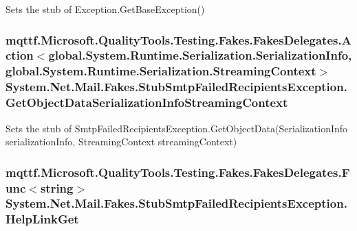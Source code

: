 Sets the stub of Exception.\-Get\-Base\-Exception()

\hypertarget{class_system_1_1_net_1_1_mail_1_1_fakes_1_1_stub_smtp_failed_recipients_exception_a70494e3b2c20af95487fb09e4c5ed0cd}{
\subsubsection[{Get\-Object\-Data\-Serialization\-Info\-Streaming\-Context}]{\setlength{\rightskip}{0pt plus 5cm}mqttf.\-Microsoft.\-Quality\-Tools.\-Testing.\-Fakes.\-Fakes\-Delegates.\-Action$<$global.\-System.\-Runtime.\-Serialization.\-Serialization\-Info, global.\-System.\-Runtime.\-Serialization.\-Streaming\-Context$>$ System.\-Net.\-Mail.\-Fakes.\-Stub\-Smtp\-Failed\-Recipients\-Exception.\-Get\-Object\-Data\-Serialization\-Info\-Streaming\-Context}}\label{class_system_1_1_net_1_1_mail_1_1_fakes_1_1_stub_smtp_failed_recipients_exception_a70494e3b2c20af95487fb09e4c5ed0cd}


Sets the stub of Smtp\-Failed\-Recipients\-Exception.\-Get\-Object\-Data(\-Serialization\-Info serialization\-Info, Streaming\-Context streaming\-Context)

\hypertarget{class_system_1_1_net_1_1_mail_1_1_fakes_1_1_stub_smtp_failed_recipients_exception_a9ecb60c4403a05e68da692ad08323ff1}{
\subsubsection[{Help\-Link\-Get}]{\setlength{\rightskip}{0pt plus 5cm}mqttf.\-Microsoft.\-Quality\-Tools.\-Testing.\-Fakes.\-Fakes\-Delegates.\-Func$<$string$>$ System.\-Net.\-Mail.\-Fakes.\-Stub\-Smtp\-Failed\-Recipients\-Exception.\-Help\-Link\-Get}}\label{class_system_1_1_net_1_1_mail_1_1_fakes_1_1_stub_smtp_failed_recipients_exception_a9ecb60c4403a05e68da692ad08323ff1}


